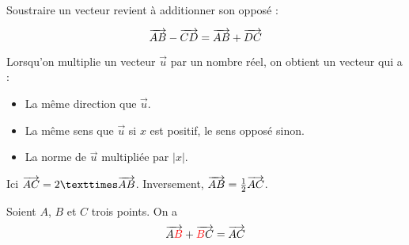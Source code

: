 \documentclass[
	classe=$2^{de}$,
	headerTitle=Généralités\space sur\space les\space vecteurs
]{coursclass}
\begin{document}
\begin{definition}
	Soustraire un vecteur revient à additionner son opposé :

	$$ \overrightarrow{AB} - \overrightarrow{CD} = \overrightarrow{AB} + \overrightarrow{DC} $$
\end{definition}

\begin{definition}
	Lorsqu’on multiplie un vecteur $\vec{u}$ par un nombre réel, on obtient un vecteur qui a :
	\begin{itemize}
		\item La même direction que $\vec{u}$.
		\item La même sens que $\vec{u}$ si $x$ est positif, le sens opposé sinon.
		\item La norme de $\vec{u}$ multipliée par $|x|$.
	\end{itemize}
\end{definition}

\begin{exemple}
	\begin{center}
	\end{center}

	Ici $\widevec{AC} = 2 × \widevec{AB}$. Inversement, $\overrightarrow{AB} = \frac{1}{2}\overrightarrow{AC}$.
\end{exemple}

\begin{propriete}
	Soient $A$, $B$ et $C$ trois points. On a
	$$ \overrightarrow{A{\color{red}B}} + \overrightarrow{{\color{red}B}C} = \overrightarrow{AC} $$
\end{propriete}
\end{document}
